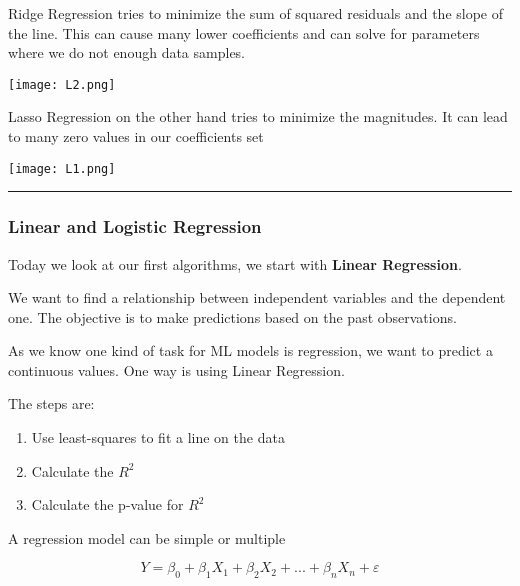 \vspace{10pt}

Ridge Regression tries to minimize the sum of squared residuals and the slope of the line. This can cause many lower coefficients and can solve for parameters where we do not enough data samples.

\texttt{[image: L2.png]}

\vspace{10pt}

Lasso Regression on the other hand tries to minimize the magnitudes. It can lead to many zero values in our coefficients set


\texttt{[image: L1.png]}





\hrule



\subsubsection{Linear and Logistic Regression}

Today we look at our first algorithms, we start with \textbf{Linear Regression}.

\vspace{10pt}

We want to find a relationship between independent variables and the dependent one. The objective is to make predictions based on the past observations.

\vspace{10pt}

As we know one kind of task for ML models is regression, we want to predict a continuous values. One way is using Linear Regression.

The steps are:
\begin{enumerate}
    \item Use least-squares to fit a line on the data
    \item Calculate the $R^2$
    \item Calculate the p-value for $R^2$
\end{enumerate}

A regression model can be simple or multiple

\begin{equation}
    Y = \beta_0 + \beta_1X_1+ \beta_2X_2+...+\beta_nX_n+\varepsilon
\end{equation}

